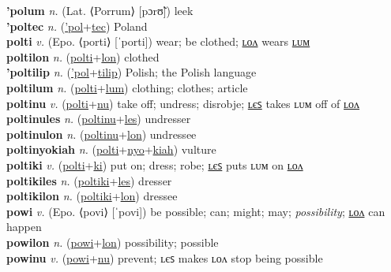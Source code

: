 \textbf{'polum} \textit{n.} (Lat. ⟨Porrum⟩ [pɔrʊ̃])
leek \label{'polum} \\
\textbf{'poltec} \textit{n.} (\hyperref['pol]{'pol}+\hyperref[tec]{tec})
Poland \label{'poltec} \\
\textbf{polti} \textit{v.} (Epo. ⟨porti⟩ [ˈporti])
wear; be clothed; \hyperref[poltilon]{ʟᴏᴧ} wears \hyperref[poltilum]{ʟᴜᴍ} \label{polti} \\
\textbf{poltilon} \textit{n.} (\hyperref[polti]{polti}+\hyperref[lon]{lon})
clothed \label{poltilon} \\
\textbf{'poltilip} \textit{n.} (\hyperref['pol]{'pol}+\hyperref[tilip]{tilip})
Polish; the Polish language \label{'poltilip} \\
\textbf{poltilum} \textit{n.} (\hyperref[polti]{polti}+\hyperref[lum]{lum})
clothing; clothes; article \label{poltilum} \\
\textbf{poltinu} \textit{v.} (\hyperref[polti]{polti}+\hyperref[nu]{nu})
take off; undress; disrobje; \hyperref[poltinules]{ʟєꜱ} takes ʟᴜᴍ off of \hyperref[poltinulon]{ʟᴏᴧ} \label{poltinu} \\
\textbf{poltinules} \textit{n.} (\hyperref[poltinu]{poltinu}+\hyperref[les]{les})
undresser \label{poltinules} \\
\textbf{poltinulon} \textit{n.} (\hyperref[poltinu]{poltinu}+\hyperref[lon]{lon})
undressee \label{poltinulon} \\
\textbf{poltinyokiah} \textit{n.} (\hyperref[polti]{polti}+\hyperref[nyo]{nyo}+\hyperref[kiah]{kiah})
vulture \label{poltinyokiah} \\
\textbf{poltiki} \textit{v.} (\hyperref[polti]{polti}+\hyperref[ki]{ki})
put on; dress; robe; \hyperref[poltikiles]{ʟєꜱ} puts ʟᴜᴍ on \hyperref[poltikilon]{ʟᴏᴧ} \label{poltiki} \\
\textbf{poltikiles} \textit{n.} (\hyperref[poltiki]{poltiki}+\hyperref[les]{les})
dresser \label{poltikiles} \\
\textbf{poltikilon} \textit{n.} (\hyperref[poltiki]{poltiki}+\hyperref[lon]{lon})
dressee \label{poltikilon} \\
\textbf{powi} \textit{v.} (Epo. ⟨povi⟩ [ˈpovi])
be possible; can; might; may; \textit{possibility}; \hyperref[powilon]{ʟᴏᴧ} can happen \label{powi} \\
\textbf{powilon} \textit{n.} (\hyperref[powi]{powi}+\hyperref[lon]{lon})
possibility; possible \label{powilon} \\
\textbf{powinu} \textit{v.} (\hyperref[powi]{powi}+\hyperref[nu]{nu})
prevent; ʟєꜱ makes ʟᴏᴧ stop being possible \label{powinu} \\
